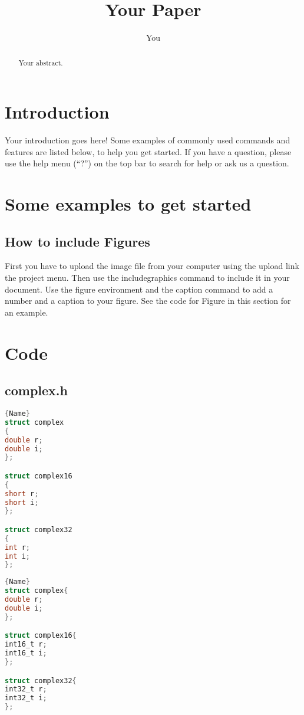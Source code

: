 \documentclass[a4paper]{article}
\title{Your Paper}
\author{You}
\begin{document}
\maketitle

\begin{abstract}
	Your abstract.
\end{abstract}

\section{Introduction}

Your introduction goes here! Some examples of commonly used commands and features are listed below, to help you get started. If you have a question, please use the help menu (``?'') on the top bar to search for help or ask us a question. 

\section{Some examples to get started}

\subsection{How to include Figures}

First you have to upload the image file from your computer using the upload link the project menu. Then use the includegraphics command to include it in your document. Use the figure environment and the caption command to add a number and a caption to your figure. See the code for Figure in this section for an example.

\section{Code}
\subsection{complex.h}
\noindent\begin{minipage}{.45\textwidth}
\begin{lstlisting}[caption=code 1 1,frame=tlrb, language=C]{Name}
struct complex
{
double r;
double i;
};

struct complex16
{
short r;
short i;
};

struct complex32
{
int r;
int i;
};
\end{lstlisting}
\end{minipage}\hfill
\begin{minipage}{.45\textwidth}
\begin{lstlisting}[caption=code 2,frame=tlrb, language=C]{Name}
struct complex{
double r;
double i;
};

struct complex16{
int16_t r;
int16_t i;
};

struct complex32{
int32_t r;
int32_t i;
};
\end{lstlisting}
\end{minipage}
\end{document}
